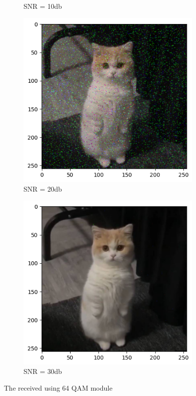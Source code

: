 \begin{figure}[htbp]
\begin{subfigure}[t]{0.49\linewidth}
        \caption{SNR = 10db}
        \label{10db}
    \end{subfigure}
    \hfil
    \begin{subfigure}[t]{0.49\linewidth}
        \includegraphics[width=\linewidth]{../Source/results/output_20db}
        \caption{SNR = 20db}
        \label{20db}
    \end{subfigure}
    \hfil
    \begin{subfigure}[t]{0.49\linewidth}
        \includegraphics[width=\linewidth]{../Source/results/output_30db}
        \caption{SNR = 30db}
        \label{30db}
    \end{subfigure}
    \caption{The received using 64 QAM module}
    \label{output}
\end{figure}

